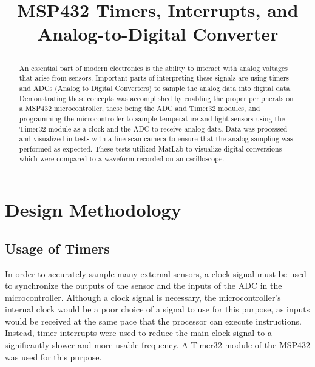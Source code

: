 \documentclass[conference]{IEEEtran}
\begin{document}
\title{MSP432 Timers, Interrupts, and Analog-to-Digital Converter\\

\author{
\and
{}
}
}

\maketitle

\begin{abstract}
An essential part of modern electronics is the ability to interact with
analog voltages that arise from sensors. Important parts of interpreting
these signals are using timers and ADCs (Analog to Digital Converters) to
sample the analog data into digital data. Demonstrating these concepts was
accomplished by enabling the proper peripherals on a MSP432 microcontroller,
these being the ADC and Timer32 modules, and programming the microcontroller
to sample temperature and light sensors using the Timer32 module
as a clock and the ADC to receive analog data. Data was processed and
visualized in tests with a line scan camera to ensure that the analog sampling
was performed as expected. These tests utilized MatLab to visualize digital 
conversions which were compared to a waveform recorded on an oscilloscope.
\end{abstract}

\section{Design Methodology}

\subsection{Usage of Timers}
In order to accurately sample many external sensors, a clock signal must be 
used to synchronize the outputs of the sensor and the inputs of the ADC in
the microcontroller. Although a clock signal is necessary, the
microcontroller's internal clock would be a poor choice of a signal to use
for this purpose, as inputs would be received at the same pace that the
processor can execute instructions. Instead, timer interrupts were used to
reduce the main clock signal to a significantly slower and more usable
frequency. A Timer32 module of the MSP432 was used for this purpose.
\end{document}
